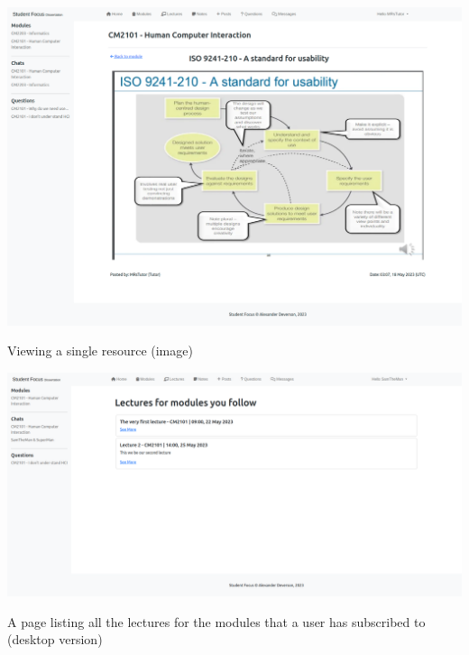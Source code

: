 \includegraphics[scale=0.20]{images/application/66 - module_resource_single_image.png}

Viewing a single resource (image)

\includegraphics[scale=0.20]{images/application/37 - lecture_list.png}

A page listing all the lectures for the modules that a user has subscribed to (desktop version)

